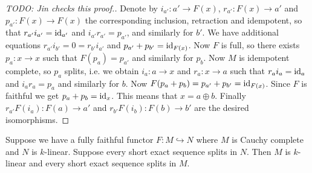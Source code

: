 \begin{proof}
  [TODO: Jin checks this proof.]

  Denote by $i_{a'}:a'\to F(x)$, $r_{a'}:F(x)\to a'$ and $p_{a'}:F(x)\to F(x)$
  the corresponding inclusion, retraction and idempotent, so that
  $r_{a'}i_{a'}=\operatorname{id}_{a'}$ and $i_{a'} r_{a'}=p_{a'}$, and similarly for $b'$.
  We have additional equations $r_{a'}i_{b'}=0=r_{b'}i_{a'}$ and
  $p_{a'}+p_{b'}=\operatorname{id}_{F(x)}$. Now $F$ is full, so there exists $p_a:x\to x$
  such that $F(p_a)=p_{a'}$ and similarly for $p_b$. Now $M$ is idempotent
  complete, so $p_a$ splits, i.e. we obtain $i_a:a\to x$ and $r_a:x\to a$ such
  that $r_a i_a=\operatorname{id}_a$ and $i_a r_a=p_a$ and similarly for $b$. Now
  $F(p_a+p_b)=p_{a'}+p_{b'}=\operatorname{id}_{F(x)}$. Since $F$ is faithful we get
  $p_a+p_b=\operatorname{id}_x$. This means that $x=a\oplus b$. Finally
  $r_{a'}F(i_a):F(a)\to a'$ and $r_{b'}F(i_b):F(b)\to b'$ are the desired
  isomorphisms.
\end{proof}

\begin{lemma}\label{abelian}
  Suppose we have a fully faithful functor $F:M\hookrightarrow N$ where $M$ is
  Cauchy complete and $N$ is $k$-linear. Suppose every short exact sequence
  splits in $N$. Then $M$ is $k$-linear and every short exact sequence splits
  in $M$.
\end{lemma}

